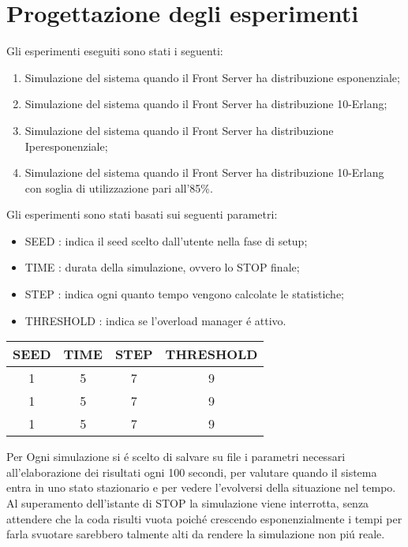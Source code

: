 \chapter{Progettazione degli esperimenti} 

\noindent Gli esperimenti eseguiti sono stati i seguenti:

\begin{enumerate}
 \item Simulazione del sistema quando il Front Server ha distribuzione esponenziale;
 \item Simulazione del sistema quando il Front Server ha distribuzione 10-Erlang;
 \item Simulazione del sistema quando il Front Server ha distribuzione Iperesponenziale;
 \item Simulazione del sistema quando il Front Server ha distribuzione 10-Erlang con soglia di utilizzazione pari all'85\%.
\end{enumerate}

\noindent \vspace{0.5cm} Gli esperimenti sono stati basati sui seguenti parametri:
\begin{itemize}
 \item SEED : indica il seed scelto dall'utente nella fase di setup;
 \item TIME : durata della simulazione, ovvero lo STOP finale;
 \item STEP : indica ogni quanto tempo vengono calcolate le statistiche;
 \item THRESHOLD : indica se l'overload manager \'e attivo.
\end{itemize}

\begin{table}[H]
 \centering
 \begin{tabular}{|c|c|c|c|}
 \hline
 SEED & TIME & STEP & THRESHOLD\\ \hline
 1 & 5 & 7 & 9 \\ \hline
 1 & 5 & 7 & 9 \\ \hline
 1 & 5 & 7 & 9 \\ \hline
 \end{tabular}
\end{table}


Per Ogni simulazione si \'e scelto di salvare su file i parametri necessari all'elaborazione dei risultati ogni 100 secondi, per valutare quando il sistema entra in uno stato stazionario e per vedere l'evolversi della situazione nel tempo. Al superamento dell'istante di STOP la simulazione viene interrotta, senza attendere che la coda risulti vuota poich\'e crescendo esponenzialmente i tempi per farla svuotare sarebbero talmente alti da rendere la simulazione non pi\'u reale.